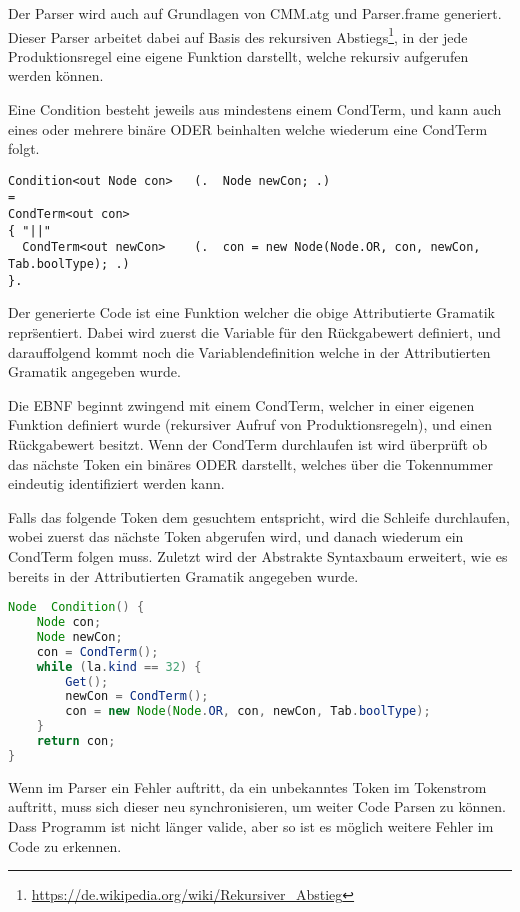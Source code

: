 Der Parser wird auch auf Grundlagen von CMM.atg und Parser.frame generiert. Dieser Parser arbeitet dabei auf Basis des rekursiven Abstiegs\footnote{\url{https://de.wikipedia.org/wiki/Rekursiver_Abstieg}}, in der jede Produktionsregel eine eigene Funktion darstellt, welche rekursiv aufgerufen werden k\"onnen.


Eine Condition besteht jeweils aus mindestens einem CondTerm, und kann auch eines oder mehrere bin\"are ODER beinhalten welche wiederum eine CondTerm folgt.

\begin{lstlisting}[language=EBNF]
Condition<out Node con>   (.  Node newCon; .)
= 
CondTerm<out con>
{ "||"                                
  CondTerm<out newCon>    (.  con = new Node(Node.OR, con, newCon, Tab.boolType); .)
}.
\end{lstlisting}

Der generierte Code ist eine Funktion welcher die obige Attributierte Gramatik repr\"sentiert. Dabei wird zuerst die Variable f\"ur den R\"uckgabewert definiert, und darauffolgend kommt noch die Variablendefinition welche in der Attributierten Gramatik angegeben wurde.

Die EBNF beginnt zwingend mit einem CondTerm, welcher in einer eigenen Funktion definiert wurde (rekursiver Aufruf von Produktionsregeln), und einen R\"uckgabewert besitzt. Wenn der CondTerm durchlaufen ist wird \"uberpr\"uft ob das n\"achste Token ein bin\"ares ODER darstellt, welches \"uber die Tokennummer eindeutig identifiziert werden kann.

Falls das folgende Token dem gesuchtem entspricht, wird die Schleife durchlaufen, wobei zuerst das n\"achste Token abgerufen wird, und danach wiederum ein CondTerm folgen muss. Zuletzt wird der Abstrakte Syntaxbaum erweitert, wie es bereits in der Attributierten Gramatik angegeben wurde.

\begin{lstlisting}[language=Java]
Node  Condition() {
	Node con;
	Node newCon; 
	con = CondTerm();
	while (la.kind == 32) {
		Get();
		newCon = CondTerm();
		con = new Node(Node.OR, con, newCon, Tab.boolType); 
	}
	return con;
}
\end{lstlisting}


Wenn im Parser ein Fehler auftritt, da ein unbekanntes Token im Tokenstrom auftritt, muss sich dieser neu synchronisieren, um weiter Code Parsen zu k\"onnen. Dass Programm ist nicht l\"anger valide, aber so ist es m\"oglich weitere Fehler im Code zu erkennen.

